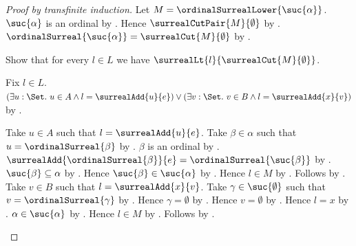 \begin{proof}[Proof by transfinite induction]
    Let $M=\ordinalSurrealLower{\suc{\alpha}}$.
    $\suc{\alpha}$ is an ordinal by .
    Hence $\surrealCutPair{M}{\emptyset}$
        by .
    $\ordinalSurreal{\suc{\alpha}}=\surrealCut{M}{\emptyset}$
        by .

    Show that for every $l\in L$ we have
        $\surrealLt{l}{\surrealCut{M}{\emptyset}}$.
    \begin{subproof}
        Fix $l\in L$.
        $(\exists u:\Set.\ u\in A\land
                l=\surrealAdd{u}{e})
            \lor
            (\exists v:\Set.\ v\in B\land
                l=\surrealAdd{x}{v})$
            by .
        \begin{byCase}
                Take $u\in A$ such that
                    $l=\surrealAdd{u}{e}$.
                Take $\beta\in\alpha$ such that
                    $u=\ordinalSurreal{\beta}$
                    by .
                $\beta$ is an ordinal
                    by .
                $\surrealAdd{\ordinalSurreal{\beta}}{e}
                    =\ordinalSurreal{\suc{\beta}}$
                    by \auto.
                $\suc{\beta}\subseteq\alpha$
                    by .
                Hence $\suc{\beta}\in\suc{\alpha}$
                    by .
                Hence $l\in M$
                    by .
                Follows by .
                Take $v\in B$ such that
                    $l=\surrealAdd{x}{v}$.
                Take $\gamma\in\suc{\emptyset}$ such that
                    $v=\ordinalSurreal{\gamma}$
                    by .
                Hence $\gamma=\emptyset$
                    by .
                Hence $v=\emptyset$
                    by .
                Hence $l=x$ by .
                $\alpha\in\suc{\alpha}$ by .
                Hence $l\in M$
                    by .
                Follows by .
        \end{byCase}
    \end{subproof}


\end{proof}
